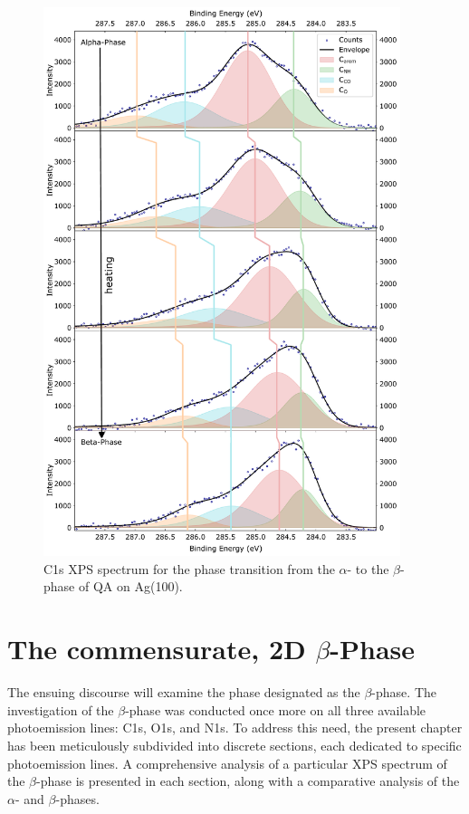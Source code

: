 \begin{figure}[H]
	\centering
	\includegraphics[width=0.93\textwidth]{images/C1s-phase-transition.pdf}
	\caption{C1s \ac{XPS} spectrum for the phase transition from the $\alpha$- to the $\beta$-phase of \ac{QA} on Ag(100).}
	\label{fig:C1s-phase-transition}
\end{figure}

\cleardoublepage
\section{The commensurate, 2D \texorpdfstring{$\beta$}{beta}-Phase}
\label{sec:res-beta}

The ensuing discourse will examine the phase designated as the $\beta$-phase. The investigation of the $\beta$-phase was conducted once more on all three available photoemission lines: C1s, O1s, and N1s. To address this need, the present chapter has been meticulously subdivided into discrete sections, each dedicated to specific photoemission lines. A comprehensive analysis of a particular \ac{XPS} spectrum of the $\beta$-phase is presented in each section, along with a comparative analysis of the $\alpha$- and $\beta$-phases.

